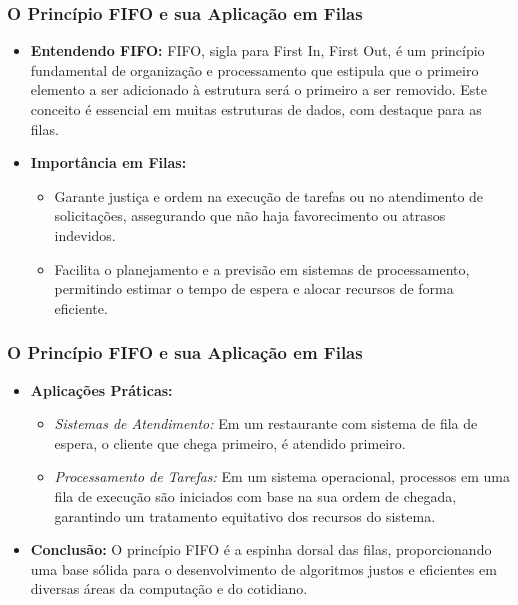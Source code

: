 \begin{frame}[fragile]
  \frametitle{O Princípio FIFO e sua Aplicação em Filas}
  \begin{itemize}
    \item \textbf{Entendendo FIFO:} FIFO, sigla para First In, First Out, é um princípio fundamental de organização e processamento que estipula que o primeiro elemento a ser adicionado à estrutura será o primeiro a ser removido. Este conceito é essencial em muitas estruturas de dados, com destaque para as filas.
    \item \textbf{Importância em Filas:}
      \begin{itemize}
        \item Garante justiça e ordem na execução de tarefas ou no atendimento de solicitações, assegurando que não haja favorecimento ou atrasos indevidos.
        \item Facilita o planejamento e a previsão em sistemas de processamento, permitindo estimar o tempo de espera e alocar recursos de forma eficiente.
      \end{itemize}
  \end{itemize}
\end{frame}
\begin{frame}[fragile]
  \frametitle{O Princípio FIFO e sua Aplicação em Filas}
  \begin{itemize}
    \item \textbf{Aplicações Práticas:}
      \begin{itemize}
        \item \textit{Sistemas de Atendimento:} Em um restaurante com sistema de fila de espera, o cliente que chega primeiro, é atendido primeiro.
        \item \textit{Processamento de Tarefas:} Em um sistema operacional, processos em uma fila de execução são iniciados com base na sua ordem de chegada, garantindo um tratamento equitativo dos recursos do sistema.
      \end{itemize}
    \item \textbf{Conclusão:} O princípio FIFO é a espinha dorsal das filas, proporcionando uma base sólida para o desenvolvimento de algoritmos justos e eficientes em diversas áreas da computação e do cotidiano.
  \end{itemize}
\end{frame}


